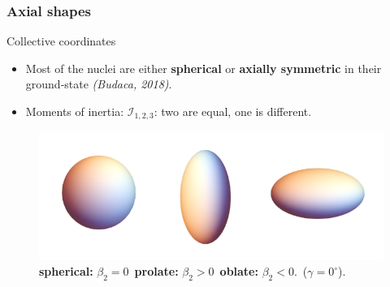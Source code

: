 \documentclass{beamer}
\begin{document}
\begin{frame}
	\frametitle{Axial shapes}
	\vspace{-0.2cm}
	\begin{block}{Collective coordinates}
		\begin{itemize}
			\item Most of the nuclei are either \textbf{spherical} or \textbf{axially symmetric} in their ground-state \textit{(Budaca, 2018)}.
            \item Moments of inertia: $\mathcal{I}_{1,2,3}$: two are equal, one is different.
		\end{itemize}
	\end{block}
	\vspace{-0.4cm}
	\begin{figure}
		\centering
		\includegraphics[scale=0.38]{figures/nuclear_shapes.png}
		\caption{\textbf{spherical:} $\beta_2=0$\ \textbf{prolate:} $\beta_2>0$\ \textbf{oblate:} $\beta_2<0$.\ ($\gamma=0^\circ$).}
	\end{figure}
\end{frame}
\end{document}
